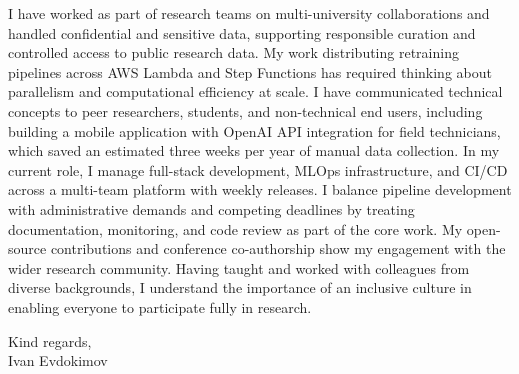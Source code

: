 \documentclass[11pt]{letter}
\begin{document}
I have worked as part of research teams on multi-university collaborations and handled confidential and sensitive data, supporting responsible curation and controlled access to public research data. My work distributing retraining pipelines across AWS Lambda and Step Functions has required thinking about parallelism and computational efficiency at scale. I have communicated technical concepts to peer researchers, students, and non-technical end users, including building a mobile application with OpenAI API integration for field technicians, which saved an estimated three weeks per year of manual data collection.
In my current role, I manage full-stack development, MLOps infrastructure, and CI/CD across a multi-team platform with weekly releases. I balance pipeline development with administrative demands and competing deadlines by treating documentation, monitoring, and code review as part of the core work. My open-source contributions and conference co-authorship show my engagement with the wider research community. Having taught and worked with colleagues from diverse backgrounds, I understand the importance of an inclusive culture in enabling everyone to participate fully in research.

Kind regards,\\
Ivan Evdokimov
\end{document}
